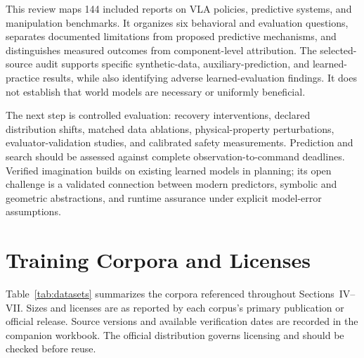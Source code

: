 \documentclass{ieeeaccess}
\begin{document}
\textcolor[RGB]{104,48,148}{This review maps 144 included reports on VLA policies, predictive systems, and manipulation benchmarks. It organizes six behavioral and evaluation questions, separates documented limitations from proposed predictive mechanisms, and distinguishes measured outcomes from component-level attribution. The selected-source audit supports specific synthetic-data, auxiliary-prediction, and learned-practice results, while also identifying adverse learned-evaluation findings. It does not establish that world models are necessary or uniformly beneficial.}

\textcolor[RGB]{104,48,148}{The next step is controlled evaluation: recovery interventions, declared distribution shifts, matched data ablations, physical-property perturbations, evaluator-validation studies, and calibrated safety measurements. Prediction and search should be assessed against complete observation-to-command deadlines. Verified imagination builds on existing learned models in planning; its open challenge is a validated connection between modern predictors, symbolic and geometric abstractions, and runtime assurance under explicit model-error assumptions.}

\appendix

\section{Training Corpora and Licenses}
\label{app:datasets}

Table~\ref{tab:datasets} summarizes the corpora referenced throughout
Sections~IV--VII. Sizes and licenses are as reported by each corpus's
\textcolor[RGB]{104,48,148}{primary publication or official release. Source versions and available verification dates are recorded in the companion workbook. The official distribution governs licensing and should be checked before reuse.}
\end{document}
